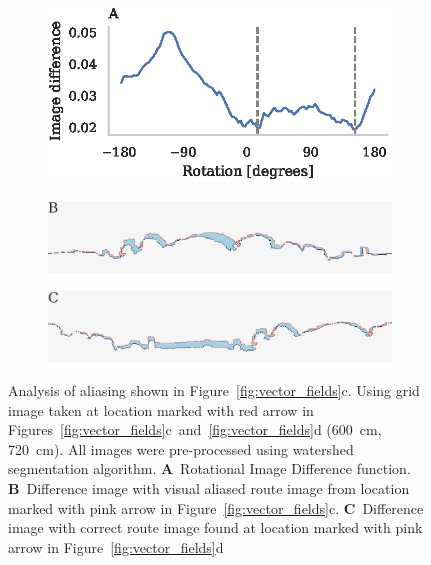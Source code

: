 \documentclass[letterpaper]{article}
\begin{document}
\begin{figure}[t]
    \centering
    \begin{subfigure}[b]{\columnwidth}
        \includegraphics[width=\columnwidth]{figures/alias_ridf.eps}
    \end{subfigure}
    \begin{subfigure}[b]{\columnwidth}
        \includegraphics[width=\columnwidth]{figures/image_diff_bad.png}
    \end{subfigure}
    \begin{subfigure}[b]{\columnwidth}
        \includegraphics[width=\columnwidth]{figures/image_diff_good.png}
    \end{subfigure}
    \caption{Analysis of aliasing shown in Figure~\ref{fig:vector_fields}c.
    Using grid image taken at location marked with red arrow in Figures~\ref{fig:vector_fields}c~and~\ref{fig:vector_fields}d (\SI{600}{\centi\metre}, \SI{720}{\centi\metre}).
    All images were pre-processed using watershed segmentation algorithm.
    \textbf{A}~Rotational Image Difference function.
    \textbf{B}~Difference image with visual aliased route image from location marked with pink arrow in Figure~\ref{fig:vector_fields}c.
    \textbf{C}~Difference image with correct route image found at location marked with pink arrow in Figure~\ref{fig:vector_fields}d}
    \label{fig:aliasing}
\end{figure}
\end{document}
